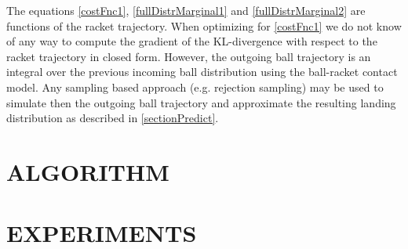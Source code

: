 \documentclass[letterpaper, 10 pt, conference]{ieeeconf}
\begin{document}
% 

%
%
%

The equations \eqref{costFnc1}, \eqref{fullDistrMarginal1} and \eqref{fullDistrMarginal2} are functions of the racket trajectory. When optimizing for \eqref{costFnc1} we do not know of any way to compute the gradient of the KL-divergence with respect to the racket trajectory in closed form. However, the outgoing ball trajectory is an integral over the previous incoming ball distribution using the ball-racket contact model. Any sampling based approach (e.g. rejection sampling) may be used to simulate then the outgoing ball trajectory and approximate the resulting landing distribution as described in \ref{sectionPredict}.


\section{ALGORITHM}\label{alg}

\section{EXPERIMENTS}\label{results}

\end{document}
